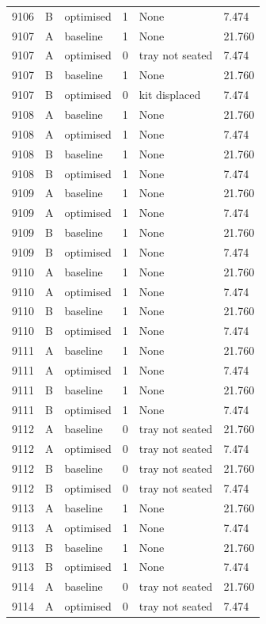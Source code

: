 \begin{longtable}{llllll}
9106 & B & optimised & 1 & None & 7.474 \\
9107 & A & baseline & 1 & None & 21.760 \\
9107 & A & optimised & 0 & tray not seated & 7.474 \\
9107 & B & baseline & 1 & None & 21.760 \\
9107 & B & optimised & 0 & kit displaced & 7.474 \\
9108 & A & baseline & 1 & None & 21.760 \\
9108 & A & optimised & 1 & None & 7.474 \\
9108 & B & baseline & 1 & None & 21.760 \\
9108 & B & optimised & 1 & None & 7.474 \\
9109 & A & baseline & 1 & None & 21.760 \\
9109 & A & optimised & 1 & None & 7.474 \\
9109 & B & baseline & 1 & None & 21.760 \\
9109 & B & optimised & 1 & None & 7.474 \\
9110 & A & baseline & 1 & None & 21.760 \\
9110 & A & optimised & 1 & None & 7.474 \\
9110 & B & baseline & 1 & None & 21.760 \\
9110 & B & optimised & 1 & None & 7.474 \\
9111 & A & baseline & 1 & None & 21.760 \\
9111 & A & optimised & 1 & None & 7.474 \\
9111 & B & baseline & 1 & None & 21.760 \\
9111 & B & optimised & 1 & None & 7.474 \\
9112 & A & baseline & 0 & tray not seated & 21.760 \\
9112 & A & optimised & 0 & tray not seated & 7.474 \\
9112 & B & baseline & 0 & tray not seated & 21.760 \\
9112 & B & optimised & 0 & tray not seated & 7.474 \\
9113 & A & baseline & 1 & None & 21.760 \\
9113 & A & optimised & 1 & None & 7.474 \\
9113 & B & baseline & 1 & None & 21.760 \\
9113 & B & optimised & 1 & None & 7.474 \\
9114 & A & baseline & 0 & tray not seated & 21.760 \\
9114 & A & optimised & 0 & tray not seated & 7.474 \\

\end{longtable}
